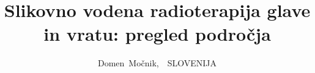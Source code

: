 \documentclass[journal]{IEEEtran}
\begin{document}
%
\title{Slikovno vodena radioterapija glave in vratu: pregled področja}
%
%
%

\author{Domen~Močnik,~~SLOVENIJA}%

% 
%



% 
\end{document}
